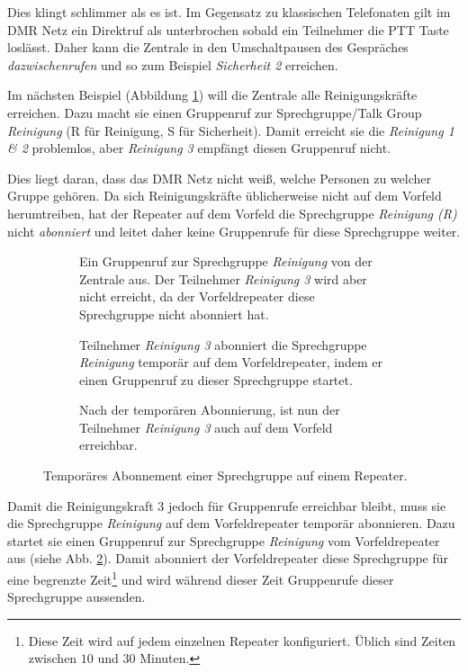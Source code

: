 Dies klingt schlimmer als es ist. Im Gegensatz zu klassischen Telefonaten gilt im DMR Netz ein Direktruf als unterbrochen sobald ein Teilnehmer die PTT Taste loslässt. Daher kann die Zentrale in den Umschaltpausen des Gespräches \emph{dazwischenrufen} und so zum Beispiel \emph{Sicherheit 2} erreichen. 

Im nächsten Beispiel (Abbildung \ref{fig:exnet3}) will die Zentrale alle Reinigungskräfte erreichen. Dazu macht sie einen Gruppenruf zur Sprechgruppe/Talk Group \emph{Reinigung} (R für Reinigung, S für Sicherheit). Damit erreicht sie die \emph{Reinigung 1 \& 2} problemlos, aber \emph{Reinigung 3} empfängt diesen Gruppenruf nicht. 

Dies liegt daran, dass das DMR Netz nicht weiß, welche Personen zu welcher Gruppe gehören. Da sich Reinigungskräfte üblicherweise nicht auf dem Vorfeld herumtreiben, hat der Repeater auf dem Vorfeld die Sprechgruppe \emph{Reinigung (R)} nicht \emph{abonniert} und leitet daher keine Gruppenrufe für diese Sprechgruppe weiter. 

\begin{figure}[p]
 \begin{subfigure}{\linewidth}
  \centering
  
  \caption{Ein Gruppenruf zur Sprechgruppe \emph{Reinigung} von der Zentrale aus. Der Teilnehmer \emph{Reinigung 3} wird aber nicht erreicht, da der Vorfeldrepeater diese Sprechgruppe nicht abonniert hat.} \label{fig:exnet3}
 \end{subfigure}\vspace{0.5cm}
 \begin{subfigure}{\linewidth}
  \centering
  
  \caption{Teilnehmer \emph{Reinigung 3} abonniert die Sprechgruppe \emph{Reinigung} temporär auf dem Vorfeldrepeater, indem er einen Gruppenruf zu dieser Sprechgruppe startet.} \label{fig:exnet4a} 
 \end{subfigure}\vspace{.5cm}
 \begin{subfigure}{\linewidth}
  \centering
  
  \caption{Nach der temporären Abonnierung, ist nun der Teilnehmer \emph{Reinigung 3} auch auf dem Vorfeld erreichbar.} \label{fig:exnet4b}
 \end{subfigure}
 \caption{Temporäres Abonnement einer Sprechgruppe auf einem Repeater.} \label{fig:exnet4}
\end{figure}

Damit die Reinigungskraft 3 jedoch für Gruppenrufe erreichbar bleibt, muss sie die Sprechgruppe \emph{Reinigung} auf dem Vorfeldrepeater temporär abonnieren. Dazu startet sie einen Gruppenruf zur Sprechgruppe \emph{Reinigung} vom Vorfeldrepeater aus (siehe Abb. \ref{fig:exnet4a}). Damit abonniert der Vorfeldrepeater diese Sprechgruppe für eine begrenzte Zeit\footnote{Diese Zeit wird auf jedem einzelnen Repeater konfiguriert. Üblich sind Zeiten zwischen $10$ und $30$ Minuten.} und wird während dieser Zeit Gruppenrufe dieser Sprechgruppe aussenden. 

